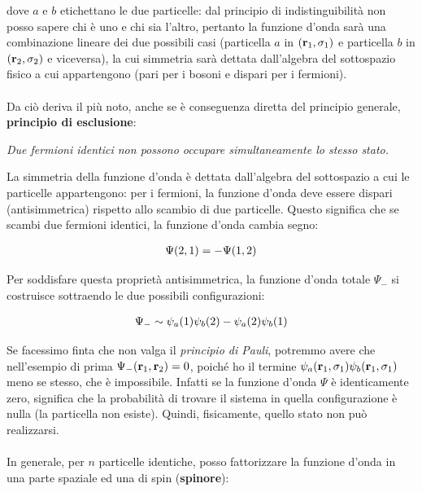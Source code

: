	dove $a$ e $b$ etichettano le due particelle: dal principio di indistinguibilità non posso sapere chi è uno e chi sia l'altro, pertanto la funzione d'onda sarà una combinazione lineare dei due possibili casi (particella $a$ in $\qty(\vb{r}_1, \sigma_1)$ e particella $b$ in $\qty(\vb{r}_2, \sigma_2)$ e viceversa), la cui simmetria sarà dettata dall'algebra del sottospazio fisico a cui appartengono (pari per i bosoni e dispari per i fermioni). 
	\\
	\\
	Da ciò deriva il più noto, anche se è conseguenza diretta del principio generale, \textbf{principio di esclusione}:
	
\begin{myprinc}
	\textit{Due fermioni identici non possono occupare simultaneamente lo stesso stato.}
\end{myprinc}

	La simmetria della funzione d'onda è dettata dall'algebra del sottospazio a cui le particelle appartengono: per i fermioni, la funzione d'onda deve essere dispari (antisimmetrica) rispetto allo scambio di due particelle. Questo significa che se scambi due fermioni identici, la funzione d'onda cambia segno:
	
\begin{align*}
	\Psi\qty(2, 1) = - \Psi\qty(1, 2)
\end{align*}

	Per soddisfare questa proprietà antisimmetrica, la funzione d'onda totale $\Psi_-$ si costruisce sottraendo le due possibili configurazioni:
	
\begin{align*}
	\Psi_- \sim \psi_a\qty(1)\psi_b\qty(2) - \psi_a\qty(2)\psi_b\qty(1)
\end{align*}

	 Se facessimo finta che non valga il \textit{principio di Pauli}, potremmo avere che nell'esempio di prima $\Psi_-\qty(\vb{r}_1, \vb{r}_2) = 0$, poiché ho il termine $\psi_a\qty(\vb{r}_1, \sigma_1) \psi_b\qty(\vb{r}_1, \sigma_1)$ meno se stesso, che è impossibile. Infatti se la funzione d'onda $\Psi$ è identicamente zero, significa che la probabilità di trovare il sistema in quella configurazione è nulla (la particella non esiste). Quindi, fisicamente, quello stato non può realizzarsi.
	\\
	\\
	In generale, per $n$ particelle identiche, posso fattorizzare la funzione d'onda in una parte spaziale ed una di spin (\textbf{spinore}):
	
